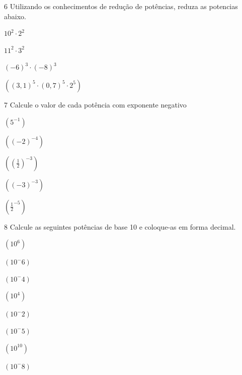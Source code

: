 \num{6} Utilizando os conhecimentos de redução de potências, reduza as
potencias abaixo.

\begin{escolha}
\item $10^2 \cdot 2^2$  
\item $11^2 \cdot 3^2$  
\item $(-6)^3 \cdot (-8)^3$  
\item $((3,1)^5 \cdot (0,7)^5 \cdot 2^5)$  
\end{escolha}





\num{7} Calcule o valor de cada potência com exponente negativo

\begin{escolha}
\item $(5^{-1})$ 
\item $((-2)^{-4}) $
\item $((\frac{1}{2})^{-3}) $
\item $((-3)^{-3}) $
\item $(\frac{1}{2}^{-5}) $
\end{escolha}


\num{8} Calcule as seguintes potências de base 10 e coloque-as em forma
decimal.

\begin{escolha}
\item $(10^6)$
\item $(10^-6)$
\item $(10^-4)$
\item $(10^4)$
\item $(10^-2)$
\item $(10 ^-5)$
\item $(10^10)$
\item $(10^-8)$
\end{escolha}

